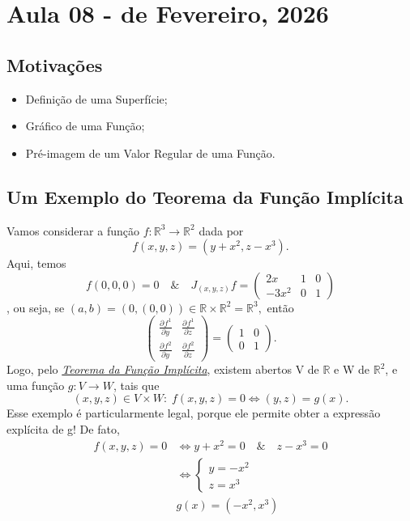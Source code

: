 \documentclass[../differential_geometry.tex]{subfiles}
\begin{document}
\section{Aula 08 - de Fevereiro, 2026}
\subsection{Motivações}
\begin{itemize}
	\item Definição de uma Superfície;
	\item Gráfico de uma Função;
	\item Pré-imagem de um Valor Regular de uma Função.
\end{itemize}
\subsection{Um Exemplo do Teorema da Função Implícita}
Vamos considerar a função \(f:\mathbb{R}^{3}\rightarrow \mathbb{R}^{2}\) dada por
\[
	f(x, y, z)=(y+x^{2}, z-x^{3}).
\]
Aqui, temos
\[
	f(0,0,0)=0 \quad\&\quad J_{(x, y, z)}f = \begin{pmatrix}
		2x      & 1 & 0 \\
		-3x^{2} & 0 & 1
	\end{pmatrix}
\],
ou seja, se \((a, b)=(0, (0,0))\in \mathbb{R}\times \mathbb{R}^{2}=\mathbb{R}^{3},\) então
\[
	\begin{pmatrix}
		\frac{\partial^{}f^{1}}{\partial y^{}} & \frac{\partial^{}f^{1}}{\partial z^{}} \\
		\frac{\partial^{}f^{2}}{\partial y^{}} & \frac{\partial^{}f^{2}}{\partial z^{}}
	\end{pmatrix} = \begin{pmatrix}
		1 & 0 \\
		0 & 1
	\end{pmatrix}.
\]
Logo, pelo \hyperlink{implicit_function}{\textit{Teorema da Função Implícita}}, existem abertos V de \(\mathbb{R}\) e W de \(\mathbb{R}^{2}\), e uma função \(g:V\rightarrow W\), tais que
\[
	(x, y, z)\in V\times W:\; f(x,y,z)=0 \Longleftrightarrow (y, z)=g(x).
\]
Esse exemplo é particularmente legal, porque ele permite obter a expressão explícita de g! De fato,
\begin{align*}
	f(x,y,z)=0 & \Longleftrightarrow y+x^{2}=0 \quad\&\quad z-x^{3}=0 \\
	           & \Longleftrightarrow \left\{\begin{array}{ll}
		                                        y=-x^{2} \\
		                                        z=x^{3}
	                                        \end{array}\right.        \\
	           & g(x)=(-x^{2}, x^{3})
\end{align*}
\end{document}
